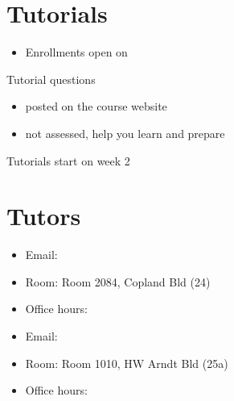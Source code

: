 \documentclass[letterpaper,10pt,english]{jupyterBook}
\begin{document}
\section{Tutorials}
\label{\detokenize{01.introduction:tutorials}}\begin{itemize}
\item {} 
\sphinxAtStartPar
Enrollments open on 

\end{itemize}

\sphinxAtStartPar
Tutorial questions
\begin{itemize}
\item {} 
\sphinxAtStartPar
posted on the course website

\item {} 
\sphinxAtStartPar
not assessed, help you learn and prepare

\end{itemize}

\sphinxAtStartPar
Tutorials start on week 2


\section{Tutors}
\label{\detokenize{01.introduction:tutors}}
\sphinxAtStartPar
{}
\begin{itemize}
\item {} 
\sphinxAtStartPar
Email: 

\item {} 
\sphinxAtStartPar
Room: Room 2084, Copland Bld (24)

\item {} 
\sphinxAtStartPar
Office hours: 

\end{itemize}

\sphinxAtStartPar
{}
\begin{itemize}
\item {} 
\sphinxAtStartPar
Email: 

\item {} 
\sphinxAtStartPar
Room: Room 1010, HW Arndt Bld (25a)

\item {} 
\sphinxAtStartPar
Office hours: 

\end{itemize}
\end{document}
